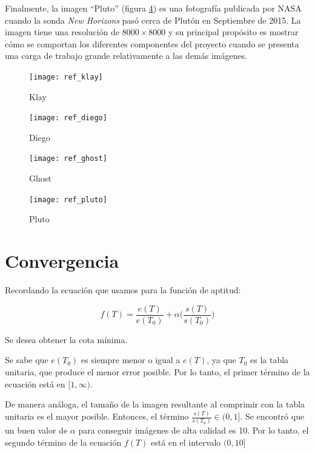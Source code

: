 Finalmente, la imagen ``Pluto'' (figura \ref{fig:ref-pluto}) es una fotografía
publicada por NASA cuando la sonda \emph{New Horizons} pasó cerca de Plutón en
Septiembre de 2015. La imagen tiene una resolución de $8000\times8000$ y su
principal propósito es mostrar cómo se comportan los diferentes componentes del
proyecto cuando se presenta una carga de trabajo grande relativamente a las
demás imágenes.

\begin{figure}[b]
    \texttt{[image: ref\_klay]}
    \caption{Klay}
    \label{fig:ref-klay}
\end{figure}

\begin{figure}[b]
    \texttt{[image: ref\_diego]}
    \caption{Diego}
    \label{fig:ref-diego}
\end{figure}

\begin{figure}[b]
    \texttt{[image: ref\_ghost]}
    \caption{Ghost}
    \label{fig:ref-ghost}
\end{figure}

\begin{figure}[b]
    \texttt{[image: ref\_pluto]}
    \caption{Pluto}
    \label{fig:ref-pluto}
\end{figure}


\section{Convergencia}

Recordando la ecuación que usamos para la función de aptitud:

\begin{equation}
f(T) = \frac{e(T)}{e(T_0)} + \alpha \Big(\frac{s(T)}{s(T_0)}\Big)
\end{equation}\label{eq:fitness-repeated}

Se desea obtener la cota mínima.

Se sabe que $e(T_0)$ es siempre menor o igual a $e(T)$, ya que $T_0$ es la
tabla unitaria, que produce el menor error posible. Por lo tanto, el primer término
de la ecuación está en $[1, \infty)$.

De manera análoga, el tamaño de la imagen resultante al comprimir con la tabla
unitaria es el mayor posible. Entonces, el término $\frac{s(T)}{s(T_0)} \in (0,
1]$. Se encontró que un buen valor de $\alpha$ para conseguir imágenes de alta
calidad es 10. Por lo tanto, el segundo término de la ecuación $f(T)$ está en
el intervalo $(0, 10]$

